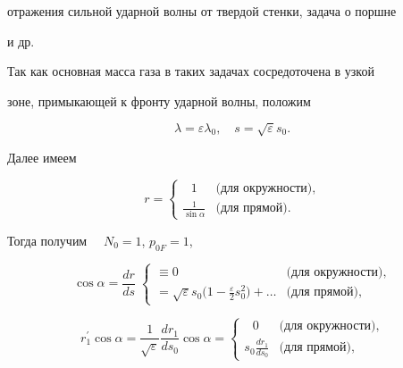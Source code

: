 отражения сильной ударной волны от твердой стенки,  задача о поршне


и др.





Так как основная масса газа в таких задачах сосредоточена в узкой


зоне,  примыкающей к фронту ударной волны,  положим


\[


\lambda = \varepsilon \lambda_0,  \quad


s = \sqrt\varepsilon s_0.


\]





Далее имеем


\[


r =


\begin{cases}


\:\:\:1  & \mbox{(для окружности)}, \\


 \frac{1}{\sin\alpha}


&\mbox{(для прямой)}.


\end{cases}


\]


Тогда получим $\quad N_0 = 1$,  $p_{0F} = 1$,


\[


\cos\alpha = \frac{dr}{ds} \;


\begin{cases} \equiv 0


 & \mbox{(для окружности)},\\


=\sqrt\varepsilon s_0 \bigl(1 - \frac{\varepsilon}{


2} s_0^2\bigr)  + \dots & \mbox{(для прямой)},


\end{cases}


\]


\[


r_1^{\prime} \cos\alpha = \frac{1}{\sqrt\varepsilon} \frac{dr_1}


{ds_0} \cos\alpha =


\begin{cases} \:\:\:0 &\mbox{(для окружности)},\\


 s_0 \frac{dr_1}{ds_0} &\mbox{(для прямой)},


\end{cases}


\]


